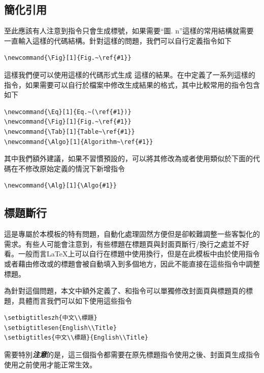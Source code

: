 \documentclass[12pt]{report}
\theoremstyle{plain}
\begin{document}
\subsection{簡化引用}

至此應該有人注意到指令只會生成標號，如果需要``圖. n''這樣的常用結構就需要一直輸入這樣的代碼結構。針對這樣的問題，我們可以自行定義指令如下
\begin{lstlisting}
\newcommand{\Fig}[1]{Fig.~\ref{#1}}
\end{lstlisting}
這樣我們便可以使用這樣的代碼形式生成 這樣的結果。在中定義了一系列這樣的指令，如果需要可以自行於檔案中修改生成結果的格式，其中比較常用的指令包含如下
\begin{lstlisting}
\newcommand{\Eq}[1]{Eq.~(\ref{#1})}
\newcommand{\Fig}[1]{Fig.~\ref{#1}}
\newcommand{\Tab}[1]{Table~\ref{#1}}
\newcommand{\Algo}[1]{Algorithm~\ref{#1}}
\end{lstlisting}
其中我們額外建議，如果不習慣預設的，可以將其修改為或者使用類似於下面的代碼在不修改原始定義的情況下新增指令
\begin{lstlisting}
\newcommand{\Alg}[1]{\Algo{#1}}
\end{lstlisting}

\subsection{標題斷行}

這是專屬於本模板的特有問題，自動化處理固然方便但是卻較難調整一些客製化的需求。有些人可能會注意到，有些標題在標題頁與封面頁斷行/換行之處並不好看。一般而言\LaTeX 上可以自行在標題中使用\code{\textbackslash\textbackslash}換行，但是在此模板中由於使用指令或者藉由修改或的標題會被自動填入到多個地方，因此不能直接在這些指令中調整標題。

為針對這個問題，本文中額外定義了、和指令可以單獨修改封面頁與標題頁的標題，具體而言我們可以如下使用這些指令
\begin{lstlisting}
\setbigtitleszh{中文\\標題}
\setbigtitlesen{English\\Title}
\setbigtitles{中文\\標題}{English\\Title}
\end{lstlisting}
需要特別\textbf{\textit{注意}}的是，這三個指令都需要在原先標題指令使用之後、封面頁生成指令使用之前使用才能正常生效。
\end{document}
